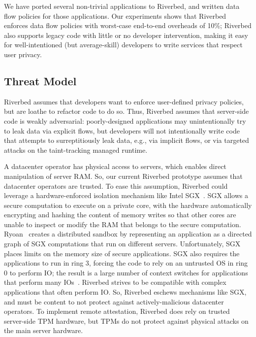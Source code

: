 We have ported several non-trivial applications to Riverbed,
and written data flow policies for those applications. Our
experiments shows that Riverbed enforces data flow policies
with worst-case end-to-end overheads of 10\%; Riverbed also
supports legacy code with little or no developer intervention,
making it easy for well-intentioned (but average-skill)
developers to write services that respect user privacy.

\subsection{Threat Model}

Riverbed assumes that developers want to enforce user-defined
privacy policies, but are loathe to refactor code to do so.
Thus, Riverbed assumes that server-side code is weakly adversarial:
poorly-designed applications may unintentionally try to leak
data via explicit flows, but developers will not intentionally
write code that attempts to surreptitiously leak data, e.g.,
via implicit flows, or via targeted attacks on the taint-tracking
managed runtime.

A datacenter operator has physical access to servers, which
enables direct manipulation of server RAM. So, our current
Riverbed prototype assumes that datacenter operators are trusted. 
To ease this assumption, Riverbed could leverage a hardware-enforced
isolation mechanism like Intel SGX~\cite{sgx}. SGX allows a
secure computation to execute on a private core, with the
hardware automatically encrypting and hashing the content
of memory writes so that other cores are unable to inspect or
modify the RAM that belongs to the secure computation.
Ryoan~\cite{ryoan} creates a distributed sandbox by representing
an application as a directed graph of SGX computations that
run on different servers. Unfortunately, SGX places limits on
the memory size of secure applications. SGX also requires
the applications to run in ring 3, forcing the code to rely
on an untrusted OS in ring 0 to perform IO; the result is a
large number of context switches for applications that perform
many IOs~\cite{haven}. Riverbed strives to be compatible with
complex applications that often perform IO. So, Riverbed eschews
mechanisms like SGX, and must be content to not protect against
actively-malicious datacenter operators.
To implement remote attestation, Riverbed does rely
on trusted server-side TPM hardware,
but TPMs do not protect against physical attacks on
the main server hardware.

